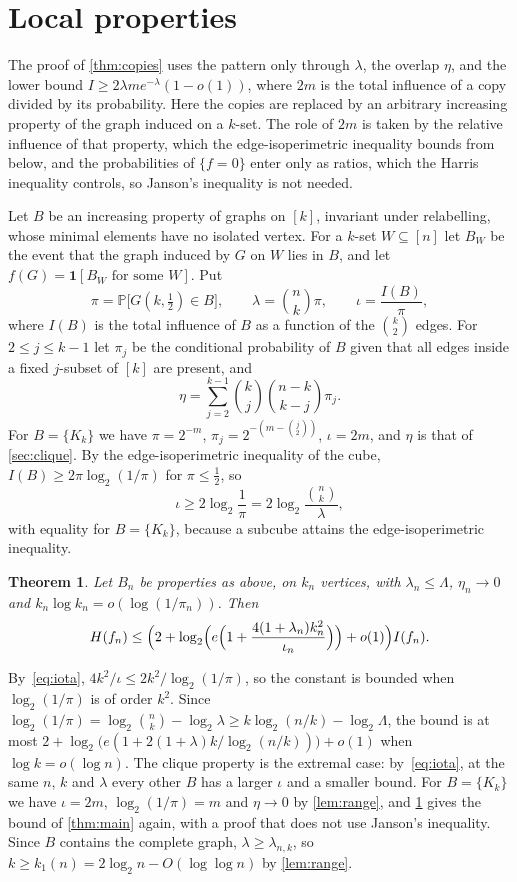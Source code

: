 \documentclass[11pt]{amsart}
\newtheorem{theorem}{Theorem}[section]
\theoremstyle{remark}
\renewcommand{\Pr}{\mathbb{P}}
\begin{document}
\section{Local properties}\label{sec:local}

The proof of \cref{thm:copies} uses the pattern only through $\lambda$, the overlap $\eta$, and the lower bound
$I\ge2\lambda me^{-\lambda}(1-o(1))$, where $2m$ is the total influence of a copy divided by its probability. Here
the copies are replaced by an arbitrary increasing property of the graph induced on a $k$-set. The role of $2m$ is
taken by the relative influence of that property, which the edge-isoperimetric inequality bounds from below, and the
probabilities of $\{f=0\}$ enter only as ratios, which the Harris inequality controls, so Janson's inequality is not
needed.

Let $B$ be an increasing property of graphs on $[k]$, invariant under relabelling, whose minimal elements have no
isolated vertex. For a $k$-set $W\subseteq[n]$ let $B_W$ be the event that the graph induced by $G$ on $W$ lies in
$B$, and let $f(G)=\mathbf 1[B_W\text{ for some }W]$. Put
\[
\pi=\Pr\bigl[G(k,\tfrac12)\in B\bigr],\qquad\lambda=\binom nk\pi,\qquad\iota=\frac{I(B)}\pi,
\]
where $I(B)$ is the total influence of $B$ as a function of the $\binom k2$ edges. For $2\le j\le k-1$ let $\pi_j$ be
the conditional probability of $B$ given that all edges inside a fixed $j$-subset of $[k]$ are present, and
\[
\eta=\sum_{j=2}^{k-1}\binom kj\binom{n-k}{k-j}\pi_j .
\]
For $B=\{K_k\}$ we have $\pi=2^{-m}$, $\pi_j=2^{-(m-\binom j2)}$, $\iota=2m$, and $\eta$ is that of
\cref{sec:clique}. By the edge-isoperimetric inequality of the cube, $I(B)\ge2\pi\log_2(1/\pi)$ for $\pi\le\frac12$, so
\begin{equation}\label{eq:iota}
\iota\ge2\log_2\frac1\pi=2\log_2\frac{\binom nk}{\lambda},
\end{equation}
with equality for $B=\{K_k\}$, because a subcube attains the edge-isoperimetric inequality.

\begin{theorem}\label{thm:local}
Let $B_n$ be properties as above, on $k_n$ vertices, with $\lambda_n\le\Lambda$, $\eta_n\to0$ and
$k_n\log k_n=o(\log(1/\pi_n))$. Then
\[
H(f_n)\le\Bigl(2+\log_2\Bigl(e\Bigl(1+\frac{4(1+\lambda_n)k_n^2}{\iota_n}\Bigr)\Bigr)+o(1)\Bigr)I(f_n).
\]
\end{theorem}

By~\eqref{eq:iota}, $4k^2/\iota\le2k^2/\log_2(1/\pi)$, so the constant is bounded when $\log_2(1/\pi)$ is of order
$k^2$. Since $\log_2(1/\pi)=\log_2\binom nk-\log_2\lambda\ge k\log_2(n/k)-\log_2\Lambda$, the bound is at most
$2+\log_2\bigl(e(1+2(1+\lambda)k/\log_2(n/k))\bigr)+o(1)$ when $\log k=o(\log n)$. The clique property is the extremal
case: by~\eqref{eq:iota}, at the same $n$, $k$ and $\lambda$ every other $B$ has a larger $\iota$ and a smaller bound.
For $B=\{K_k\}$ we have $\iota=2m$, $\log_2(1/\pi)=m$ and $\eta\to0$ by \cref{lem:range}, and \cref{thm:local} gives the
bound of \cref{thm:main} again, with a proof that does not use Janson's inequality. Since $B$ contains the complete
graph, $\lambda\ge\lambda_{n,k}$, so $k\ge k_1(n)=2\log_2n-O(\log\log n)$ by \cref{lem:range}.
\end{document}
